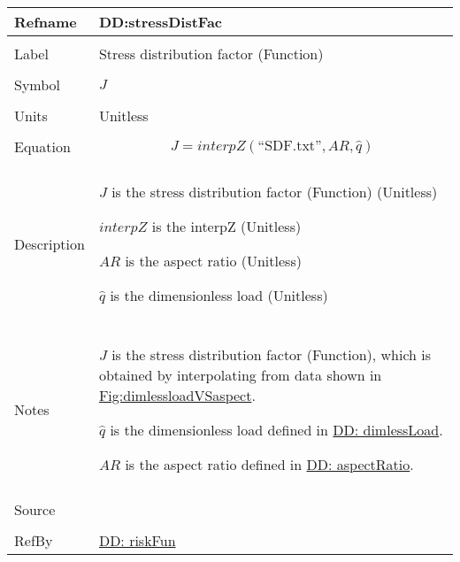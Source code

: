 \documentclass[12pt]{article}
\begin{document}
\vspace{\baselineskip}
\noindent
\begin{minipage}{\textwidth}
\begin{tabular}{>{\raggedright}p{}>{\raggedright\arraybackslash}p{}}
\toprule \textbf{Refname} & \textbf{DD:stressDistFac}
\label{DD:stressDistFac}
\\ \midrule \\
Label & Stress distribution factor (Function)
        
\\ \midrule \\
Symbol & $J$
         
\\ \midrule \\
Units & Unitless
        
\\ \midrule \\
Equation & \begin{displaymath}
           J=interpZ\left(\text{``SDF.txt''},AR,\hat{q}\right)
           \end{displaymath}
\\ \midrule \\
Description & \begin{symbDescription}
              \item{$J$ is the stress distribution factor (Function) (Unitless)}
              \item{$interpZ$ is the interpZ (Unitless)}
              \item{$AR$ is the aspect ratio (Unitless)}
              \item{$\hat{q}$ is the dimensionless load (Unitless)}
              \end{symbDescription}
\\ \midrule \\
Notes & $J$ is the stress distribution factor (Function), which is obtained by interpolating from data shown in \hyperref[Figure:dimlessloadVSaspect]{Fig:dimlessloadVSaspect}.
        
        $\hat{q}$ is the dimensionless load defined in \hyperref[DD:dimlessLoad]{DD: dimlessLoad}.
        
        $AR$ is the aspect ratio defined in \hyperref[DD:aspectRatio]{DD: aspectRatio}.
        
\\ \midrule \\
Source & \cite{astm2009}
         
\\ \midrule \\
RefBy & \hyperref[DD:riskFun]{DD: riskFun}
        
\\ \bottomrule
\end{tabular}
\end{minipage}
\end{document}
